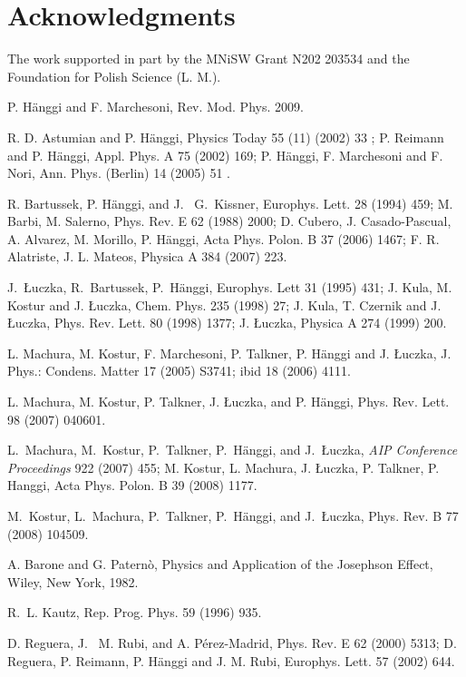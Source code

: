 \documentclass{physeauth}
\begin{document}
\section*{Acknowledgments} 
\noindent The work supported in part  by the MNiSW Grant
N202 203534 and the Foundation for Polish Science (L. M.).

\begin{thebibliography}{100}

 P. H\"anggi and F. Marchesoni, Rev. Mod. Phys. 2009. 

 R. D. Astumian and P.
H\"anggi, Physics Today 55 (11) (2002) 33 ;  P. Reimann and P. H\"anggi,
Appl. Phys. A  75 (2002) 169; P. H\"anggi, F. Marchesoni  and F.
Nori, Ann. Phys. (Berlin)  14 (2005) 51 .

 R. Bartussek, P. H\"anggi, and J.~ G.~Kissner,
Europhys. Lett.  28 (1994) 459; 
M. Barbi, M. Salerno,  Phys. Rev. E 62  (1988) 2000;  
D. Cubero, J.  Casado-Pascual, A.  Alvarez, M.  Morillo, P.  H\"anggi,  Acta Phys. Polon. 
 B 37 (2006) 1467;  
F. R.  Alatriste,  J. L.  Mateos, Physica A  384 (2007)  223. 

 J.~{\L}uczka, R.~Bartussek, P.~H\"anggi, Europhys. Lett   31 (1995) 431;
J.  Kula, M. Kostur and J. \L uczka,  Chem. Phys.  235 (1998) 27;
 J. Kula, T. Czernik and J.  {\L}uczka,  Phys. Rev. Lett.    80 (1998) 1377;
J. \L uczka,  Physica A  274 (1999) 200.


 L. Machura, M. Kostur, F. Marchesoni, P. Talkner,
  P. H\"anggi and J.  {\L}uczka, J. Phys.: Condens. Matter  17 (2005)
  S3741; ibid 18  (2006) 4111.

 L. Machura, M. Kostur, P. Talkner, J. {\L}uczka,
and P. H\"anggi, Phys. Rev. Lett.  98 (2007) 040601.

L.~Machura, M.~Kostur, P.~Talkner, P.~H\"anggi, and J.~{\L}uczka,
\emph{AIP Conference Proceedings} 922 (2007) 455; 
M. Kostur, L. Machura, J. {\L}uczka, P. Talkner, P. Hanggi,  Acta Phys. Polon. B 39 (2008) 1177. 

M.~Kostur, L.~Machura, P.~Talkner, P.~H\"anggi, and J.~{\L}uczka,
Phys. Rev. B  77 (2008) 104509. 

 A. Barone and G. Patern\`o,  Physics and
    Application of the Josephson Effect, Wiley, New York, 1982.

 R.~L. Kautz, Rep. Prog. Phys. 59 (1996) 935.

 D. Reguera, J.~ M. Rubi, and A. P\'erez-Madrid, Phys.
  Rev. E  62 (2000) 5313; D. Reguera, P. Reimann, P. H\"anggi
  and J. M. Rubi, Europhys. Lett.  57 (2002) 644.


\end{thebibliography}
\end{document}
